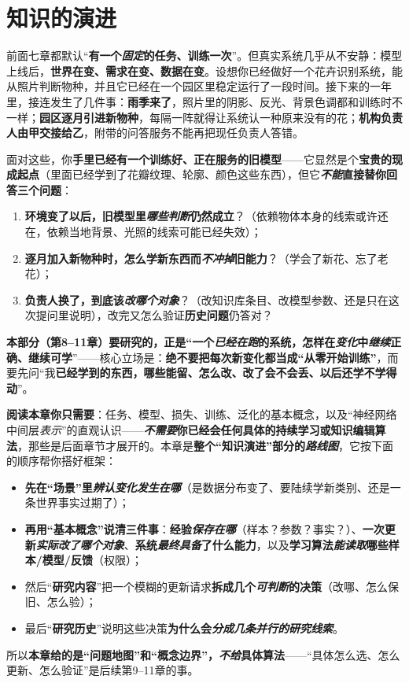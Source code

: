 \chapter{知识的演进}
\label{chap:ket-overview}

前面七章都默认“\textbf{有一个\emph{固定}的任务、训练一次}”。但真实系统几乎从不安静：模型上线后，\textbf{世界在变、需求在变、数据在变}。设想你已经做好一个花卉识别系统，能从照片判断物种，并且它已经在一个园区里稳定运行了一段时间。接下来的一年里，接连发生了几件事：\textbf{雨季来了}，照片里的阴影、反光、背景色调都和训练时不一样；\textbf{园区逐月引进新物种}，每隔一阵就得让系统认一种原来没有的花；\textbf{机构负责人由甲交接给乙}，附带的问答服务不能再把现任负责人答错。

面对这些，你\textbf{手里已经有一个训练好、正在服务的旧模型}——它显然是个\textbf{宝贵的现成起点}（里面已经学到了花瓣纹理、轮廓、颜色这些东西），但它\textbf{\emph{不能}直接替你回答三个问题}：
\begin{enumerate}\item \textbf{环境变了以后，旧模型里\emph{哪些判断}仍然成立}？（依赖物体本身的线索或许还在，依赖当地背景、光照的线索可能已经失效）；\item \textbf{逐月加入新物种时，怎么学新东西而\emph{不冲掉}旧能力}？（学会了新花、忘了老花）；\item \textbf{负责人换了，到底该\emph{改哪个对象}}？（改知识库条目、改模型参数、还是只在这次提问里说明），改完又怎么验证\textbf{历史问题}仍答对？\end{enumerate}
\textbf{本部分（第8–11章）要研究的，正是“一个\emph{已经在跑}的系统，怎样在\emph{变化}中\emph{继续}正确、继续可学}”——核心立场是：\textbf{绝不要把每次新变化都当成“从零开始训练”}，而要先问“我\textbf{已经学到的东西，哪些能留、怎么改、改了会不会丢、以后还学不学得动}”。

\textbf{阅读本章你只需要}：任务、模型、损失、训练、泛化的基本概念，以及“神经网络中间层\emph{表示}”的直观认识——\textbf{\emph{不需要}你已经会任何具体的持续学习或知识编辑算法}，那些是后面章节才展开的。本章是\textbf{整个“知识演进”部分的\emph{路线图}}，它按下面的顺序帮你搭好框架：
\begin{itemize}\item \textbf{先在“场景”里\emph{辨认变化发生在哪}}（是数据分布变了、要陆续学新类别、还是一条世界事实过期了）；\item \textbf{再用“基本概念”说清三件事}：\textbf{经验\emph{保存在哪}}（样本？参数？事实？）、\textbf{一次更新\emph{实际改了哪个对象}}、\textbf{系统\emph{最终具备}了什么能力}，以及\textbf{学习算法\emph{能读取}哪些样本/模型/反馈}（权限）；\item 然后“\textbf{研究内容}”把一个模糊的更新请求\textbf{拆成几个\emph{可判断}的决策}（改哪、怎么保旧、怎么验）；\item 最后“\textbf{研究历史}”说明这些决策\textbf{为什么会\emph{分成几条并行的研究线索}}。\end{itemize}
所以\textbf{本章给的是“问题地图”和“概念边界”，\emph{不给}具体算法}——“具体怎么选、怎么更新、怎么验证”是后续第9–11章的事。

